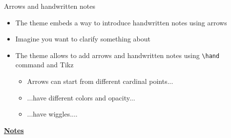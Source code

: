 \documentclass[10pt]{beamer}
\begin{document}
\begin{frame}[t]
    {Arrows and handwritten notes}\bigskip
    \begin{itemize}
        \item The theme embeds a way to introduce handwritten notes using arrows \bigskip\medskip
        \item Imagine you want to clarify something about  \bigskip\medskip
        \item The theme allows to add arrows and handwritten notes using \texttt{\textbackslash hand} command and Tikz \medskip
        \begin{itemize}
            \item Arrows can start from different cardinal points... \medskip
            \item ...have different colors and opacity... \medskip
            \item ...have wiggles....
        \end{itemize}
    \end{itemize}
\end{frame}
\begin{flushleft}
    \underline{\textbf{Notes}}\setlength{\parskip}{.15cm}\notesize\newline\par
\end{flushleft}
\end{document}
